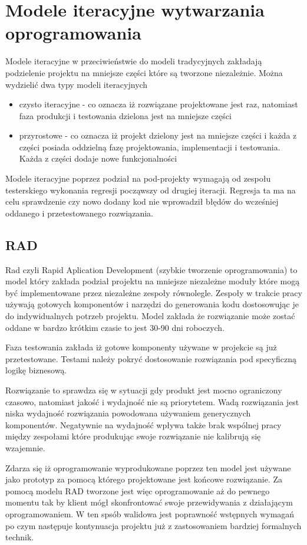 \section{Modele iteracyjne wytwarzania oprogramowania}
Modele iteracyjne w przeciwieństwie do modeli tradycyjnych zakładają podzielenie projektu na mniejsze części które są tworzone niezależnie. Można wydzielić dwa typy modeli iteracyjnych
\begin{itemize}
  \item czysto iteracyjne - co oznacza iż rozwiązane projektowane jest raz, natomiast faza produkcji i testowania dzielona jest na mniejsze części
  \item przyrostowe - co oznacza iż projekt dzielony jest na mniejsze części i każda z części posiada oddzielną fazę projektowania, implementacji i testowania. Każda z części dodaje nowe funkcjonalności
 
\end{itemize}
 Modele iteracyjne poprzez podział na pod-projekty wymagają od zespołu testerskiego wykonania regresji począwszy od drugiej iteracji. Regresja ta ma na celu sprawdzenie czy nowo dodany kod nie wprowadził błędów do wcześniej oddanego i przetestowanego rozwiązania.
\subsection{RAD}
Rad czyli Rapid Aplication Development (szybkie tworzenie oprogramowania) to model który zakłada podział projektu na mniejsze
 niezależne moduły które mogą być implementowane przez niezależne zespoły równolegle. Zespoły w trakcie pracy używają gotowych komponentów i narzędzi do generowania kodu dostosowując je do indywidualnych potrzeb projektu. Model zakłada że rozwiązanie może zostać oddane w bardzo krótkim czasie to jest 30-90 dni roboczych.

Faza testowania zakłada iż gotowe komponenty używane w projekcie są już przetestowane. Testami należy pokryć dostosowanie rozwiązania pod specyficzną logikę biznesową. 

Rozwiązanie to sprawdza się w sytuacji gdy produkt jest mocno ograniczony czasowo, natomiast jakość i wydajność nie są priorytetem. Wadą rozwiązania jest niska wydajność rozwiązania powodowana używaniem generycznych komponentów. Negatywnie na wydajność wpływa także brak wspólnej pracy między zespołami które produkując swoje rozwiązanie nie kalibrują się wzajemnie.

Zdarza się iż oprogramowanie wyprodukowane poprzez ten model jest używane jako prototyp za pomocą którego projektowane jest końcowe rozwiązanie. Za pomocą modelu RAD tworzone jest więc oprogramowanie aż do pewnego momentu tak by klient mógł skonfrontować swoje przewidywania z działającym oprogramowaniem. W ten spsób walidowa jest poprawność wstępnych wymagań po czym następuje kontynuacja projektu już z zastosowaniem bardziej formalnych technik.

